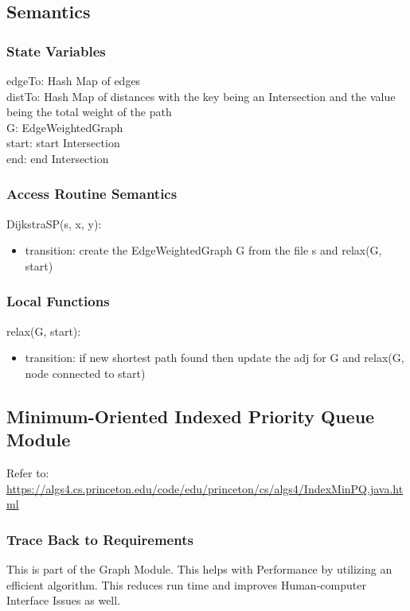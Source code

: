 \documentclass[12pt]{article}
\begin{document}
\subsection*{Semantics}
\subsubsection*{State Variables}
edgeTo: Hash Map of edges\\
distTo: Hash Map of distances with the key being an Intersection and the value being the total weight of the path\\
G: EdgeWeightedGraph\\
start: start Intersection\\
end: end Intersection

\subsubsection*{Access Routine Semantics}
\noindent DijkstraSP(s, x, y):
\begin{itemize}
    \item transition: create the EdgeWeightedGraph G from the file s and relax(G, start)
\end{itemize}

\subsubsection*{Local Functions}

relax(G, start):
\begin{itemize}
    \item transition: if new shortest path found then update the adj for G and relax(G, node connected to start)
\end{itemize}

\newpage
\subsection{Minimum-Oriented Indexed Priority Queue Module}
Refer to: \url{https://algs4.cs.princeton.edu/code/edu/princeton/cs/algs4/IndexMinPQ.java.html}

\subsubsection*{Trace Back to Requirements}
This is part of the Graph Module. This helps with Performance by utilizing an efficient algorithm. This reduces run time and improves Human-computer Interface Issues as well.
\end{document}
